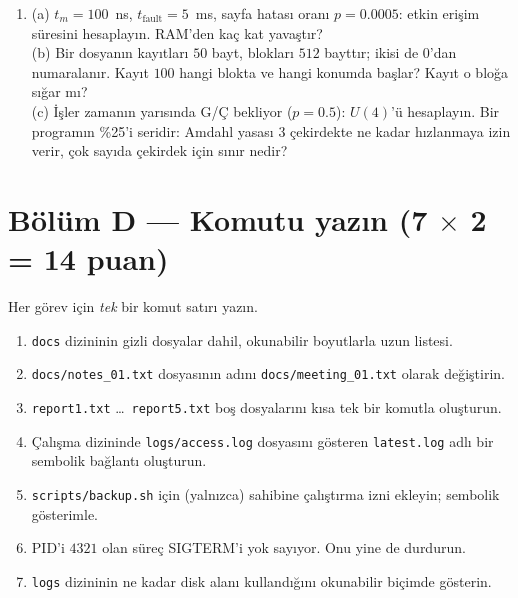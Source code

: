 \begin{enumerate}[leftmargin=1.8em,label=C\arabic*.]
  \item (a) $t_m = 100$~ns, $t_{\text{fault}} = 5$~ms, sayfa hatası oranı $p = 0.0005$: etkin erişim süresini hesaplayın. RAM'den kaç kat yavaştır? \\
  (b) Bir dosyanın kayıtları $50$ bayt, blokları $512$ bayttır; ikisi de $0$'dan numaralanır. Kayıt $100$ hangi blokta ve hangi konumda başlar? Kayıt o bloğa sığar mı? \\
  (c) İşler zamanın yarısında G/Ç bekliyor ($p = 0.5$): $U(4)$'ü hesaplayın. Bir programın \%25'i seridir: Amdahl yasası $3$ çekirdekte ne kadar hızlanmaya izin verir, çok sayıda çekirdek için sınır nedir? 
  \ans{6.0cm}
\end{enumerate}

\newpage
\section*{Bölüm D --- Komutu yazın \hfill (7 $\times$ 2 = 14 puan)}
Her görev için \emph{tek} bir komut satırı yazın.
\begin{enumerate}[leftmargin=1.8em,label=D\arabic*.]
  \item \texttt{docs} dizininin gizli dosyalar dahil, okunabilir boyutlarla uzun listesi. \ans{0.9cm}
  \item \texttt{docs/notes\_01.txt} dosyasının adını \texttt{docs/meeting\_01.txt} olarak değiştirin. \ans{0.9cm}
  \item \texttt{report1.txt} \dots\ \texttt{report5.txt} boş dosyalarını kısa tek bir komutla oluşturun. \ans{0.9cm}
  \item Çalışma dizininde \texttt{logs/access.log} dosyasını gösteren \texttt{latest.log} adlı bir sembolik bağlantı oluşturun. \ans{0.9cm}
  \item \texttt{scripts/backup.sh} için (yalnızca) sahibine çalıştırma izni ekleyin; sembolik gösterimle. \ans{0.9cm}
  \item PID'i $4321$ olan süreç SIGTERM'i yok sayıyor. Onu yine de durdurun. \ans{0.9cm}
  \item \texttt{logs} dizininin ne kadar disk alanı kullandığını okunabilir biçimde gösterin. \ans{0.9cm}
\end{enumerate}

